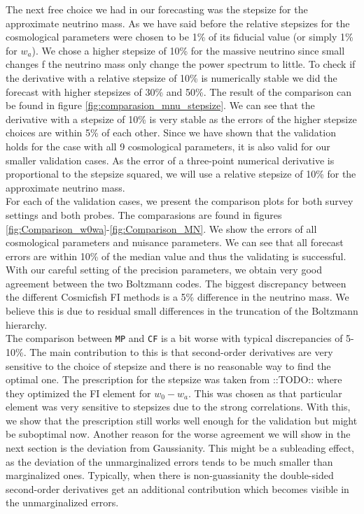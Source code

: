 \documentclass[oneside]{book}
\newcommand*{\marktodo}{{\color{mmcol} ::TODO::}\xspace}
\newcommand*{\montepython}{\texttt{MP}\xspace}
\newcommand*{\cosmicfish}{\texttt{CF}\xspace}
\begin{document}
The next free choice we had in our forecasting was the stepsize for the approximate neutrino mass. As we have said before the relative stepsizes for the cosmological parameters were chosen to be 1\% of its fiducial value (or simply 1\% for $w_a$). We chose a higher stepsize of 10\% for the massive neutrino since small changes f the neutrino mass only change the power spectrum to little. To check if the derivative with a relative stepsize of 10\% is numerically stable we did the forecast with higher stepsizes of 30\% and 50\%. The result of the comparison can be found in figure \ref{fig:comparasion_mnu_stepsize}. We can see that the derivative with a stepsize of 10\% is very stable as the errors of the higher stepsize choices are within 5\% of each other. Since we have shown that the validation holds for the case with all 9 cosmological parameters, it is also valid for our smaller validation cases. As the error of a three-point numerical derivative is proportional to the stepsize squared, we will use a relative stepsize of 10\% for the approximate neutrino mass.\\
For each of the validation cases, we present the comparison plots for both survey settings and both probes. The comparasions are found in figures \ref{fig:Comparison_w0wa}-\ref{fig:Comparison_MN}. We show the errors of all cosmological parameters and nuisance parameters. We can see that all forecast errors are within 10\% of the median value and thus the validating is successful. With our careful setting of the precision parameters, we obtain very good agreement between the two Boltzmann codes. The biggest discrepancy between the different Cosmicfish FI methods is a 5\% difference in the neutrino mass. We believe this is due to residual small differences in the truncation of the Boltzmann hierarchy.\\
The comparison between \montepython and \cosmicfish is a bit worse with typical discrepancies of 5-10\%. The main contribution to this is that second-order derivatives are very sensitive to the choice of stepsize and there is no reasonable way to find the optimal one. The prescription for the stepsize was taken from \marktodo where they optimized the FI element for $w_0-w_a$. This was chosen as that particular element was very sensitive to stepsizes due to the strong correlations. With this, we show that the prescription still works well enough for the validation but might be suboptimal now. Another reason for the worse agreement we will show in the next section is the deviation from Gaussianity. This might be a subleading effect, as the deviation of the unmarginalized errors tends to be much smaller than marginalized ones. Typically, when there is non-guassianity the double-sided second-order derivatives get an additional contribution which becomes visible in the unmarginalized errors.
\end{document}

